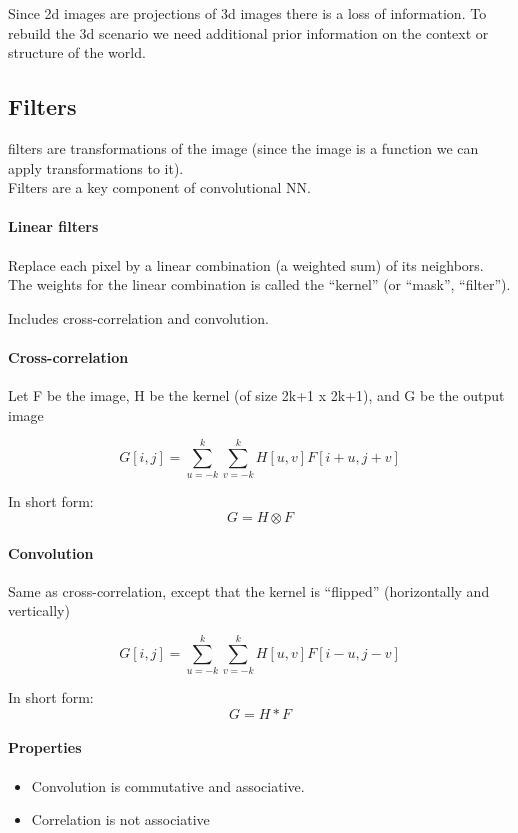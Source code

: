 Since 2d images are projections of 3d images there is a loss of information.
To rebuild the 3d scenario we need additional prior information on the context or
structure of the world.



\subsection[short]{Filters}
filters are transformations of the image (since the image is a function we can
apply transformations to it).\\
Filters are a key component of convolutional NN.

\paragraph*{Linear filters}
Replace each pixel by a linear combination (a weighted
sum) of its neighbors.
The weights for the linear combination is called the
“kernel” (or “mask”, “filter”).

Includes cross-correlation and convolution.

\paragraph*{Cross-correlation}
Let F be the image, H be the kernel (of
size 2k+1 x 2k+1), and G be the output
image

\[
    G[i,j] = \sum_{u=-k}^{k} \sum_{v=-k}^{k} H[u,v] F[i+u, j+v]
\]

In short form:
\[
    G = H \otimes F
\]

\paragraph*{Convolution}
Same as cross-correlation, except that the
kernel is “flipped” (horizontally and vertically)

\[
    G[i,j] = \sum_{u=-k}^{k} \sum_{v=-k}^{k} H[u,v] F[i-u, j-v]
\]

In short form:
\[
    G = H * F
\]

\paragraph*{Properties}
\begin{itemize}
    \item Convolution is commutative and associative.
    \item Correlation is not associative
\end{itemize}


